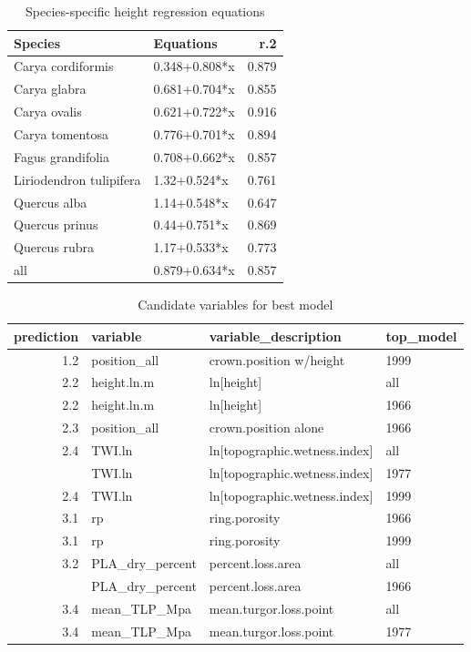 \documentclass[]{article}
\begin{document}
\begin{table}[!h]

\caption{\label{tab:Table S1}Species-specific height regression equations}
\centering
\begin{tabular}{llr}
\toprule
Species & Equations & r.2\\
\midrule
Carya cordiformis & 0.348+0.808*x & 0.879\\
Carya glabra & 0.681+0.704*x & 0.855\\
Carya ovalis & 0.621+0.722*x & 0.916\\
Carya tomentosa & 0.776+0.701*x & 0.894\\
Fagus grandifolia & 0.708+0.662*x & 0.857\\
\addlinespace
Liriodendron tulipifera & 1.32+0.524*x & 0.761\\
Quercus alba & 1.14+0.548*x & 0.647\\
Quercus prinus & 0.44+0.751*x & 0.869\\
Quercus rubra & 1.17+0.533*x & 0.773\\
all & 0.879+0.634*x & 0.857\\
\bottomrule
\end{tabular}
\end{table}

\begin{table}[!h]

\caption{\label{tab:Table S2}Candidate variables for best model}
\centering
\begin{tabular}{rlll}
\toprule
prediction & variable & variable\_description & top\_model\\
\midrule
1.2 & position\_all & crown.position w/height & 1999\\
2.2 & height.ln.m & ln[height] & all\\
2.2 & height.ln.m & ln[height] & 1966\\
2.3 & position\_all & crown.position alone & 1966\\
2.4 & TWI.ln & ln[topographic.wetness.index] & all\\
\addlinespace
2.4 & TWI.ln & ln[topographic.wetness.index] & 1977\\
2.4 & TWI.ln & ln[topographic.wetness.index] & 1999\\
3.1 & rp & ring.porosity & 1966\\
3.1 & rp & ring.porosity & 1999\\
3.2 & PLA\_dry\_percent & percent.loss.area & all\\
\addlinespace
3.2 & PLA\_dry\_percent & percent.loss.area & 1966\\
3.4 & mean\_TLP\_Mpa & mean.turgor.loss.point & all\\
3.4 & mean\_TLP\_Mpa & mean.turgor.loss.point & 1977\\
\bottomrule
\end{tabular}
\end{table}
\end{document}
